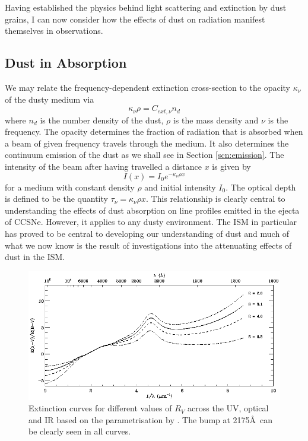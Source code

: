 Having established the physics behind light scattering and extinction by dust grains, I can now consider how the effects of dust on radiation manifest themselves in observations. 



\subsection{Dust in Absorption}
\label{scn:abs}
 

We may relate the frequency-dependent extinction cross-section to the opacity $\kappa_{\nu}$ of the dusty medium via
\begin{equation}
\kappa_{\nu} \rho = C_{ext,\nu} n_d
\end{equation}
\noindent where $n_d$ is the number density of the dust, $\rho$ is the mass density and $\nu$ is the frequency.  The opacity determines the fraction of radiation that is absorbed when a beam of given frequency travels through the medium.  It also determines the continuum emission of the dust as we shall see in Section \ref{scn:emission}.  The intensity of the beam after having travelled a distance $x$ is given by
\begin{equation}
I(x)=I_0 e^{-\kappa_{\nu} \rho x}
\end{equation}
\noindent  for a medium with constant density $\rho$ and initial intensity $I_0$.  The optical depth  is defined to be the quantity $\tau_{\nu}=\kappa_{\nu} \rho x$.  This relationship is clearly central to understanding the effects of dust absorption on line profiles emitted in the ejecta of CCSNe.  However, it applies to any dusty environment.  The ISM in particular has proved to be central to developing our understanding of dust and much of what we now know is the result of investigations into the attenuating effects of dust in the ISM.  
 
 \begin{figure}
\centering
\includegraphics[clip=true,scale=0.53,trim= 0 0 0 0]{chapters/chapter1/figs/extinction_curves2.png}
\caption{Extinction curves for different values of $R_V$ across the UV, optical and IR based on the parametrisation by \citet{Cardelli1989}.  The bump at 2175\AA\ can be clearly seen in all curves.}
\label{fig:ext_curve}
\end{figure}
 

